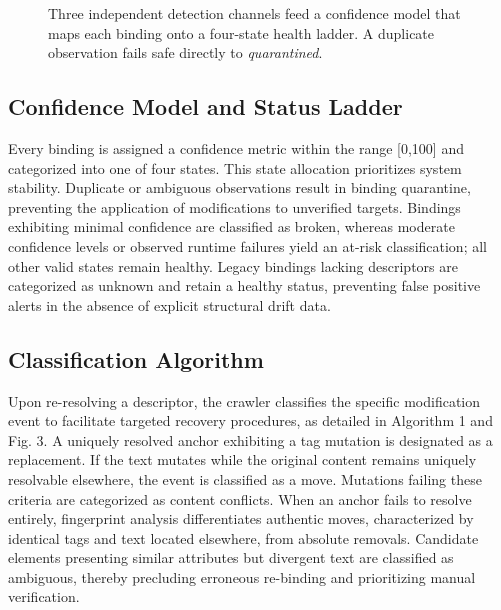 \documentclass[conference]{IEEEtran}
\begin{document}
\begin{figure}[t]
\centering
{}
\caption{Three independent detection channels feed a confidence model that maps each binding onto a four-state health ladder. A duplicate observation fails safe directly to \emph{quarantined}.}
\label{fig:channels}
\end{figure}

\subsection{Confidence Model and Status Ladder}
Every binding is assigned a confidence metric within the range [0,100] and categorized into one of four states. This state allocation prioritizes system stability. Duplicate or ambiguous observations result in binding quarantine, preventing the application of modifications to unverified targets. Bindings exhibiting minimal confidence are classified as broken, whereas moderate confidence levels or observed runtime failures yield an at-risk classification; all other valid states remain healthy. Legacy bindings lacking descriptors are categorized as unknown and retain a healthy status, preventing false positive alerts in the absence of explicit structural drift data.

\subsection{Classification Algorithm}
Upon re-resolving a descriptor, the crawler classifies the specific modification event to facilitate targeted recovery procedures, as detailed in Algorithm 1 and Fig. 3. A uniquely resolved anchor exhibiting a tag mutation is designated as a replacement. If the text mutates while the original content remains uniquely resolvable elsewhere, the event is classified as a move. Mutations failing these criteria are categorized as content conflicts. When an anchor fails to resolve entirely, fingerprint analysis differentiates authentic moves, characterized by identical tags and text located elsewhere, from absolute removals. Candidate elements presenting similar attributes but divergent text are classified as ambiguous, thereby precluding erroneous re-binding and prioritizing manual verification.
\end{document}
